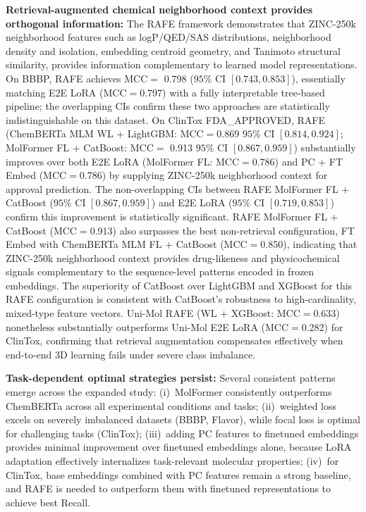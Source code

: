 \documentclass[pdflatex,sn-mathphys-num]{sn-jnl}%
\theoremstyle{thmstyleone}%
\theoremstyle{thmstyletwo}%
\theoremstyle{thmstylethree}%
\begin{document}
\textbf{Retrieval-augmented chemical neighborhood context provides orthogonal information:}
The RAFE framework demonstrates that ZINC-250k neighborhood features such as logP/QED/SAS distributions, neighborhood density and isolation, embedding centroid geometry, and Tanimoto structural similarity, provides information complementary to learned model representations. On BBBP, RAFE achieves MCC$=$ 0.798 ($95\%$ CI $[0.743, 0.853]$), essentially matching E2E LoRA (MCC$=$0.797) with a fully interpretable tree-based pipeline; the overlapping CIs confirm these two approaches are statistically indistinguishable on this dataset. On ClinTox FDA\_APPROVED, RAFE (ChemBERTa MLM WL + LightGBM: MCC$=$0.869 $95\%$ CI $[0.814, 0.924]$; MolFormer FL + CatBoost: MCC$=$ 0.913 $95\%$ CI $[0.867, 0.959]$) substantially improves over both E2E LoRA (MolFormer FL: MCC$=$0.786) and PC + FT Embed (MCC$=$0.786) by supplying ZINC-250k neighborhood context for approval prediction. The non-overlapping CIs between RAFE MolFormer FL + CatBoost ($95\%$ CI $[0.867, 0.959]$) and E2E LoRA ($95\%$ CI $[0.719, 0.853]$) confirm this improvement is statistically significant. RAFE MolFormer FL + CatBoost (MCC$=$0.913) also surpasses the best non-retrieval configuration, FT Embed with ChemBERTa MLM FL + CatBoost (MCC$=$0.850), indicating that ZINC-250k neighborhood context provides drug-likeness and physicochemical signals complementary to the sequence-level patterns encoded in frozen embeddings. The superiority of CatBoost over LightGBM and XGBoost for this RAFE configuration is consistent with CatBoost's robustness to high-cardinality, mixed-type feature vectors. Uni-Mol RAFE (WL + XGBoost: MCC$=$0.633) nonetheless substantially outperforms Uni-Mol E2E LoRA (MCC$=$0.282) for ClinTox, confirming that retrieval augmentation compensates effectively when end-to-end 3D learning fails under severe class imbalance.

\textbf{Task-dependent optimal strategies persist:} Several consistent patterns emerge across the expanded study:
(i)~MolFormer consistently outperforms ChemBERTa across all experimental conditions and tasks; 
(ii)~weighted loss excels on severely imbalanced datasets (BBBP, Flavor), while focal
loss is optimal for challenging tasks (ClinTox); 
(iii)~adding PC features to finetuned embeddings provides minimal improvement over finetuned embeddings alone, because LoRA adaptation effectively internalizes task-relevant molecular properties;
(iv)~for ClinTox, base embeddings combined with PC features remain a strong baseline, and RAFE is needed to outperform them with finetuned representations to achieve best Recall.
\end{document}
